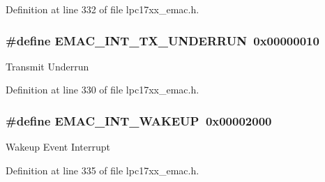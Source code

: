 \-Definition at line 332 of file lpc17xx\-\_\-emac.\-h.

\hypertarget{group___e_m_a_c___private___macros_gab98666e1647b566ac76f186f43bc9441}{
\subsubsection[{\-E\-M\-A\-C\-\_\-\-I\-N\-T\-\_\-\-T\-X\-\_\-\-U\-N\-D\-E\-R\-R\-U\-N}]{\setlength{\rightskip}{0pt plus 5cm}\#define {\bf \-E\-M\-A\-C\-\_\-\-I\-N\-T\-\_\-\-T\-X\-\_\-\-U\-N\-D\-E\-R\-R\-U\-N}~0x00000010}}\label{group___e_m_a_c___private___macros_gab98666e1647b566ac76f186f43bc9441}
\-Transmit \-Underrun 

\-Definition at line 330 of file lpc17xx\-\_\-emac.\-h.

\hypertarget{group___e_m_a_c___private___macros_ga0acb15113d6cc2224f333850d2aecb4f}{
\subsubsection[{\-E\-M\-A\-C\-\_\-\-I\-N\-T\-\_\-\-W\-A\-K\-E\-U\-P}]{\setlength{\rightskip}{0pt plus 5cm}\#define {\bf \-E\-M\-A\-C\-\_\-\-I\-N\-T\-\_\-\-W\-A\-K\-E\-U\-P}~0x00002000}}\label{group___e_m_a_c___private___macros_ga0acb15113d6cc2224f333850d2aecb4f}
\-Wakeup \-Event \-Interrupt 

\-Definition at line 335 of file lpc17xx\-\_\-emac.\-h.

